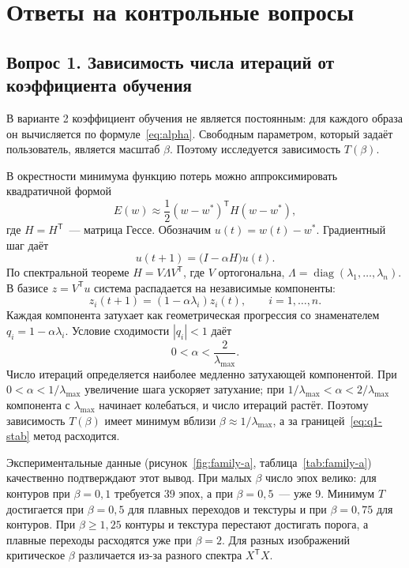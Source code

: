 \section{Ответы на контрольные вопросы}
\label{sec:questions}

\subsection{Вопрос 1. Зависимость числа итераций от коэффициента обучения}

В варианте 2 коэффициент обучения не является постоянным: для каждого образа он вычисляется по формуле~\eqref{eq:alpha}. Свободным параметром, который задаёт пользователь, является масштаб $\beta$. Поэтому исследуется зависимость $T(\beta)$.

В окрестности минимума функцию потерь можно аппроксимировать квадратичной формой
\begin{equation}
	E(w) \approx \frac{1}{2}(w-w^*)^{\mathsf{T}}H(w-w^*),
\end{equation}
где $H=H^{\mathsf{T}}$~--- матрица Гессе. Обозначим $u(t)=w(t)-w^*$. Градиентный шаг даёт
\begin{equation}
	u(t+1)=\bigl(I-\alpha H\bigr)u(t).
\end{equation}
По спектральной теореме $H=V\Lambda V^{\mathsf{T}}$, где $V$ ортогональна, $\Lambda=\operatorname{diag}(\lambda_1,\ldots,\lambda_n)$. В базисе $z=V^{\mathsf{T}}u$ система распадается на независимые компоненты:
\begin{equation}
	z_i(t+1)=(1-\alpha\lambda_i)z_i(t),\qquad i=1,\ldots,n.
	\label{eq:q1-eigen}
\end{equation}
Каждая компонента затухает как геометрическая прогрессия со знаменателем $q_i=1-\alpha\lambda_i$. Условие сходимости $|q_i|<1$ даёт
\begin{equation}
	0<\alpha<\frac{2}{\lambda_{\max}}.
	\label{eq:q1-stab}
\end{equation}
Число итераций определяется наиболее медленно затухающей компонентой. При $0<\alpha<1/\lambda_{\max}$ увеличение шага ускоряет затухание; при $1/\lambda_{\max}<\alpha<2/\lambda_{\max}$ компонента с $\lambda_{\max}$ начинает колебаться, и число итераций растёт. Поэтому зависимость $T(\beta)$ имеет минимум вблизи $\beta\approx1/\lambda_{\max}$, а за границей~\eqref{eq:q1-stab} метод расходится.

Экспериментальные данные (рисунок~\ref{fig:family-a}, таблица~\ref{tab:family-a}) качественно подтверждают этот вывод. При малых $\beta$ число эпох велико: для контуров при $\beta=0{,}1$ требуется 39 эпох, а при $\beta=0{,}5$~--- уже 9. Минимум $T$ достигается при $\beta=0{,}5$ для плавных переходов и текстуры и при $\beta=0{,}75$ для контуров. При $\beta\ge1{,}25$ контуры и текстура перестают достигать порога, а плавные переходы расходятся уже при $\beta=2$. Для разных изображений критическое $\beta$ различается из-за разного спектра $X^{\mathsf{T}}X$.

